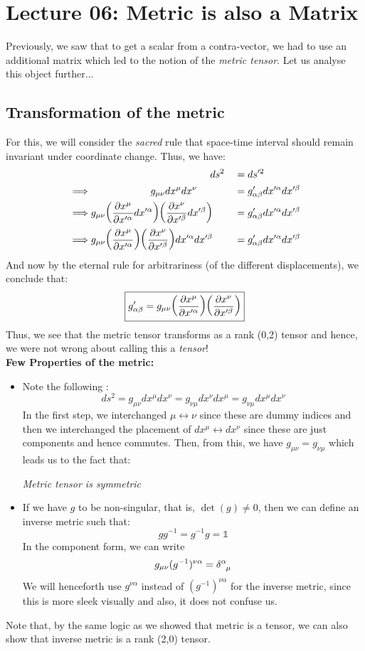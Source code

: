 \section*{Lecture 06: Metric is also a Matrix}
Previously, we saw that to get a scalar from a contra-vector, we had to use an additional matrix which led to the notion of the \textit{metric tensor}. Let us analyse this object further...
\subsection{Transformation of the metric}
For this, we will consider the \textit{sacred} rule that space-time interval should remain invariant under coordinate change. Thus, we have:
\begin{alignat*}{3}
&\qquad\qquad\qquad\qquad \qquad \qquad ds^2 &&= ds'^2\\
\implies & \qquad\qquad\qquad g_{\mu\nu} dx^\mu dx^\nu &&= g'_{\alpha\beta} dx'^\alpha dx'^\beta\\
\implies & g_{\mu\nu} \qty(\pdv{x^\mu}{x'^\alpha}dx'^\alpha) \qty(\pdv{x^\nu}{x'^\beta}dx'^\beta) &&=g'_{\alpha\beta} dx'^\alpha dx'^\beta\\
\implies &g_{\mu\nu} \qty(\pdv{x^\mu}{x'^\alpha}) \qty(\pdv{x^\nu}{x'^\beta})dx'^\alpha dx'^\beta&&=g'_{\alpha\beta} dx'^\alpha dx'^\beta
\end{alignat*}
And now by the eternal rule for arbitrariness (of the different displacements), we conclude that:
$$\boxed{g'_{\alpha\beta} = g_{\mu\nu} \qty(\pdv{x^\mu}{x'^\alpha}) \qty(\pdv{x^\nu}{x'^\beta})}$$
Thus, we see that the metric tensor transforms as a rank (0,2) tensor and hence, we were not wrong about calling this a \textit{tensor}!\\[0.2cm]
\textbf{Few Properties of the metric:}
\begin{itemize}
    \item Note the following :
    $$ds^2 = g_{\mu\nu}dx^\mu dx^\nu =g_{\nu\mu}dx^\nu dx^\mu =g_{\nu\mu}dx^\mu dx^\nu$$
    In the first step, we interchanged $\mu \leftrightarrow \nu$ since these are dummy indices and then we interchanged the placement of $dx^\mu \leftrightarrow dx^\nu$ since these are just components and hence commutes. Then, from this, we have $g_{\mu\nu} = g_{\nu\mu}$ which leads us to the fact that:
    \begin{center}
        \textit{Metric tensor is symmetric}
    \end{center}
    \item If we have $g$ to be non-singular, that is, $\det(g)\neq 0$, then we can define an inverse metric such that:
    $$g g^{-1} = g^{-1} g = \mathds{1}$$
    In the component form, we can write $$g_{\mu\nu}(g^{-1})^{\nu\alpha} = \tensor{\delta}{^\alpha _\mu}$$
We will henceforth use $g^{\nu\alpha}$ instead of $(g^{-1})^{\nu\alpha}$ for the inverse metric, since this is more sleek visually and also, it does not confuse us. 
\end{itemize}
Note that, by the same logic as we showed that metric is a tensor, we can also show that inverse metric is a rank (2,0) tensor. 
